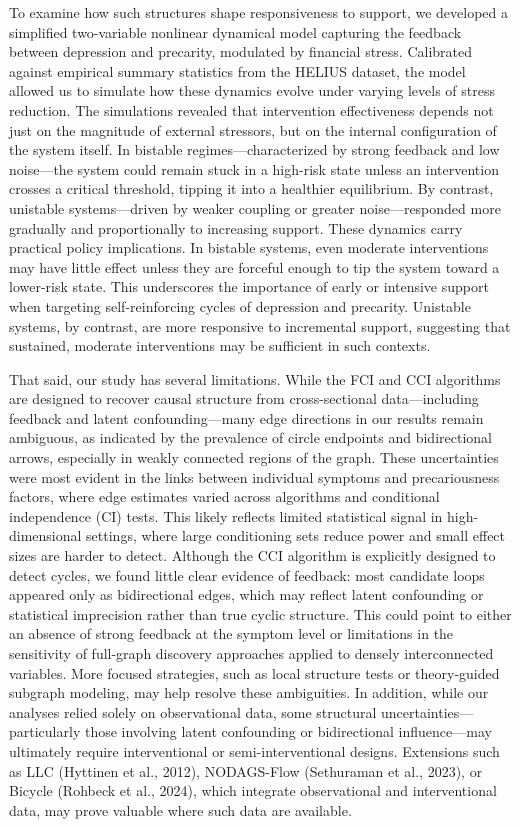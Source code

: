 \documentclass[
]{article}
\begin{document}
To examine how such structures shape responsiveness to support, we
developed a simplified two-variable nonlinear dynamical model capturing
the feedback between depression and precarity, modulated by financial
stress. Calibrated against empirical summary statistics from the HELIUS
dataset, the model allowed us to simulate how these dynamics evolve
under varying levels of stress reduction. The simulations revealed that
intervention effectiveness depends not just on the magnitude of external
stressors, but on the internal configuration of the system itself. In
bistable regimes---characterized by strong feedback and low noise---the
system could remain stuck in a high-risk state unless an intervention
crosses a critical threshold, tipping it into a healthier equilibrium.
By contrast, unistable systems---driven by weaker coupling or greater
noise---responded more gradually and proportionally to increasing
support. These dynamics carry practical policy implications. In bistable
systems, even moderate interventions may have little effect unless they
are forceful enough to tip the system toward a lower-risk state. This
underscores the importance of early or intensive support when targeting
self-reinforcing cycles of depression and precarity. Unistable systems,
by contrast, are more responsive to incremental support, suggesting that
sustained, moderate interventions may be sufficient in such contexts.

That said, our study has several limitations. While the FCI and CCI
algorithms are designed to recover causal structure from cross-sectional
data---including feedback and latent confounding---many edge directions
in our results remain ambiguous, as indicated by the prevalence of
circle endpoints and bidirectional arrows, especially in weakly
connected regions of the graph. These uncertainties were most evident in
the links between individual symptoms and precariousness factors, where
edge estimates varied across algorithms and conditional independence
(CI) tests. This likely reflects limited statistical signal in
high-dimensional settings, where large conditioning sets reduce power
and small effect sizes are harder to detect. Although the CCI algorithm
is explicitly designed to detect cycles, we found little clear evidence
of feedback: most candidate loops appeared only as bidirectional edges,
which may reflect latent confounding or statistical imprecision rather
than true cyclic structure. This could point to either an absence of
strong feedback at the symptom level or limitations in the sensitivity
of full-graph discovery approaches applied to densely interconnected
variables. More focused strategies, such as local structure tests or
theory-guided subgraph modeling, may help resolve these ambiguities. In
addition, while our analyses relied solely on observational data, some
structural uncertainties---particularly those involving latent
confounding or bidirectional influence---may ultimately require
interventional or semi-interventional designs. Extensions such as LLC
(Hyttinen et al., 2012), NODAGS-Flow (Sethuraman et al., 2023), or
Bicycle (Rohbeck et al., 2024), which integrate observational and
interventional data, may prove valuable where such data are available.
\end{document}
